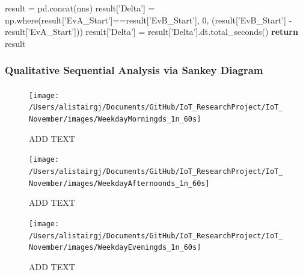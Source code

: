 \documentclass[11pt,]{article}
\newenvironment{Shaded}{\begin{snugshade}}{\end{snugshade}}
\newcommand{\ControlFlowTok}[1]{\textcolor[rgb]{0.12,0.11,0.11}{\textbf{#1}}}
\newcommand{\DecValTok}[1]{\textcolor[rgb]{0.69,0.50,0.00}{#1}}
\newcommand{\NormalTok}[1]{\textcolor[rgb]{0.12,0.11,0.11}{#1}}
\newcommand{\OperatorTok}[1]{\textcolor[rgb]{0.12,0.11,0.11}{#1}}
\newcommand{\StringTok}[1]{\textcolor[rgb]{0.75,0.01,0.01}{#1}}
\let\oldparagraph\paragraph
\renewcommand{\paragraph}[1]{\oldparagraph{#1}\mbox{}}
\begin{document}
\begin{Shaded}
\begin{Highlighting}[]
    
\NormalTok{    result }\OperatorTok{=}\NormalTok{ pd.concat(nns)}
\NormalTok{    result[}\StringTok{'Delta'}\NormalTok{] }\OperatorTok{=}\NormalTok{ np.where(result[}\StringTok{'EvA_Start'}\NormalTok{]}\OperatorTok{==}\NormalTok{result[}\StringTok{'EvB_Start'}\NormalTok{], }
                               \DecValTok{0}\NormalTok{,}
\NormalTok{                               (result[}\StringTok{'EvB_Start'}\NormalTok{] }\OperatorTok{-}\NormalTok{ result[}\StringTok{'EvA_Start'}\NormalTok{]))}
\NormalTok{    result[}\StringTok{'Delta'}\NormalTok{] }\OperatorTok{=}\NormalTok{ result[}\StringTok{'Delta'}\NormalTok{].dt.total_seconds()}
    \ControlFlowTok{return}\NormalTok{ result}
\end{Highlighting}
\end{Shaded}

\pagebreak

\hypertarget{qualitative-sequential-analysis-via-sankey-diagram}{%
\subsubsection{Qualitative Sequential Analysis via Sankey
Diagram}\label{qualitative-sequential-analysis-via-sankey-diagram}}

\hypertarget{section}{%
\paragraph{}\label{section}}

\begin{figure}[H]

{\centering \texttt{[image: /Users/alistairgj/Documents/GitHub/IoT\_ResearchProject/IoT\_November/images/WeekdayMorningds\_1n\_60s]} 

}

\caption{ADD TEXT}\label{fig:unnamed-chunk-12}
\end{figure}

\begin{figure}[H]

{\centering \texttt{[image: /Users/alistairgj/Documents/GitHub/IoT\_ResearchProject/IoT\_November/images/WeekdayAfternoonds\_1n\_60s]} 

}

\caption{ADD TEXT}\label{fig:unnamed-chunk-13}
\end{figure}

\begin{figure}[H]

{\centering \texttt{[image: /Users/alistairgj/Documents/GitHub/IoT\_ResearchProject/IoT\_November/images/WeekdayEveningds\_1n\_60s]} 

}

\caption{ADD TEXT}\label{fig:unnamed-chunk-14}
\end{figure}
\end{document}

